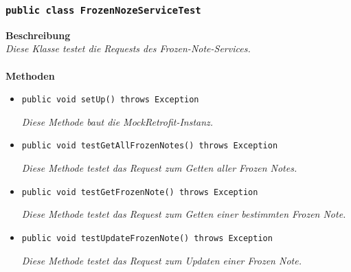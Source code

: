 \documentclass[a4paper]{scrreprt}
\begin{document}
	\subsubsection{\texttt{public class FrozenNozeServiceTest}}
	\textbf{Beschreibung}\\
	\textit{Diese Klasse testet die Requests des Frozen-Note-Services.}\\
	\\
	\textbf{Methoden}
	\begin{itemize}
		
		
		\item\texttt{{public void setUp() throws Exception}}
		
		\textit{Diese Methode baut die MockRetrofit-Instanz.}
		
		\item\texttt{{public void testGetAllFrozenNotes() throws Exception}}
		
		\textit{Diese Methode testet das Request zum Getten aller Frozen Notes.}
		
		\item\texttt{{public void testGetFrozenNote() throws Exception}}
		
		\textit{Diese Methode testet das Request zum Getten einer bestimmten Frozen Note.}
		
		\item\texttt{{public void testUpdateFrozenNote() throws Exception}}
		
		\textit{Diese Methode testet das Request zum Updaten einer Frozen Note.}
		
	\end{itemize}
\end{document}
